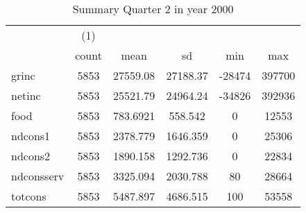 \begin{table}[htbp]\centering
\def\sym#1{\ifmmode^{#1}\else\(^{#1}\)\fi}
\caption{Summary Quarter 2 in year 2000 \label{sum\_Q2\_y2000}}
\begin{tabular}{l*{1}{ccccc}}
\hline\hline
            &\multicolumn{1}{c}{(1)}&            &            &            &            \\
            &       count&        mean&          sd&         min&         max\\
\hline
grinc       &        5853&    27559.08&    27188.37&      -28474&      397700\\
netinc      &        5853&    25521.79&    24964.24&      -34826&      392936\\
food        &        5853&    783.6921&     558.542&           0&       12553\\
ndcons1     &        5853&    2378.779&    1646.359&           0&       25306\\
ndcons2     &        5853&    1890.158&    1292.736&           0&       22834\\
ndconsserv  &        5853&    3325.094&    2030.788&          80&       28664\\
totcons     &        5853&    5487.897&    4686.515&         100&       53558\\
\hline\hline
\end{tabular}
\end{table}
